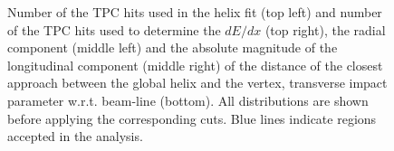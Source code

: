 \begin{figure}[h!]
\begin{subfigure}{.45\textwidth}
	\end{subfigure}
	\begin{minipage}{.45\textwidth}
		
		
		\caption[$N_{hits}^{fit}$ and $N_{hits}^{dE/dx}$, $DCA_{xy}$ and $|DCA_z|$, $d_0$ before applying the corresponding cuts]{Number of the  TPC hits used in the helix fit (top left) and number of the  TPC hits used to determine the $dE/dx$ (top right), the radial component (middle left) and the absolute magnitude of the longitudinal component (middle right) of the distance of the closest approach between  the global helix and the vertex, transverse impact parameter w.r.t. beam-line (bottom). All distributions are shown before applying  the corresponding cuts. Blue lines indicate regions accepted in the analysis.}
		\label{fig:dca_nhitsSTAR}
	\end{minipage}
\end{figure}
\captionsetup{format=default,indention=0pt,justification=justified}


\FloatBarrier